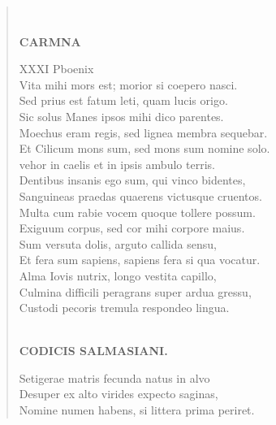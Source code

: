 \documentclass[11pt, a4paper]{report}
\begin{document}
\begin{verse}
        ﻿\pagebreak 
     \marginpar{[230]} \begin{center} \textbf{CARMNA} \end{center}XXXI Pboenix \\ Vita mihi mors est; morior si coepero nasci. \\ Sed prius est fatum leti, quam lucis origo. \\ Sic solus Manes ipsos mihi dico parentes. \\ Moechus eram regis, sed lignea membra sequebar. \\ Et Cilicum mons sum, sed mons sum nomine solo. \\ vehor in caelis et in ipsis ambulo terris. \\ Dentibus insanis ego sum, qui vinco bidentes, \\ Sanguineas praedas quaerens victusque cruentos. \\ Multa cum rabie vocem quoque tollere possum. \\ Exiguum corpus, sed cor mihi corpore maius. \\ Sum versuta dolis, arguto callida sensu, \\ Et fera sum sapiens, sapiens fera si qua vocatur. \\ Alma Iovis nutrix, longo vestita capillo, \\ Culmina difficili peragrans super ardua gressu, \\ Custodi pecoris tremula respondeo lingua. \\ 
        ﻿\pagebreak 
    \begin{center} \textbf{CODICIS SALMASIANI.} \end{center} \marginpar{[0221]} Setigerae matris fecunda natus in alvo \\ Desuper ex alto virides expecto saginas, \\ Nomine numen habens, si littera prima periret. \\ 
      \end{verse}
  
\end{document}
